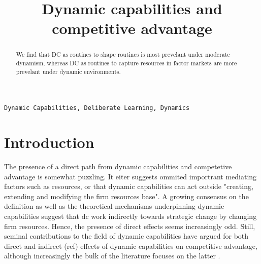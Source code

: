 \documentclass[review,fleqn]{elsarticle}\usepackage[]{graphicx}\usepackage[]{color}
\begin{document}
\begin{frontmatter}


\title{Dynamic capabilities and competitive advantage}





\begin{abstract}
 We find that DC as routines to shape routines is most prevelant under moderate dynamism,
whereas DC as routines to capture resources in factor markets are more prevelant under
dynamic environments.

\end{abstract}

\begin{keyword}
\texttt{Dynamic Capabilities, Deliberate Learning, Dynamics }
\end{keyword}

\end{frontmatter}



\doublespacing


\section{Introduction}



The presence of a direct path from dynamic capabilities and competetive advantage is
somewhat puzzling. It eiter suggests ommited importrant mediating factors such as
resources, or that dynamic capabilities can act outside "creating, extending and modifying
the firm resources base". A growing consensus on the definition as well as the
theoretical mechanisms underpinning dynamic capabilities suggest that dc work indirectly
towards strategic change by changing firm resources. Hence, the presence of direct effects
seems increasingly odd. Still, seminal contributions to the field of dynamic capabilities have argued for both direct
\cite{Kor2005,Eriksson2014,Schilke2014a} and indirect (ref) effects of dynamic
capabilities on competitive advantage, although increasingly the bulk of the literature
focuses on the latter \citep{Schilke2018}.
\end{document}
